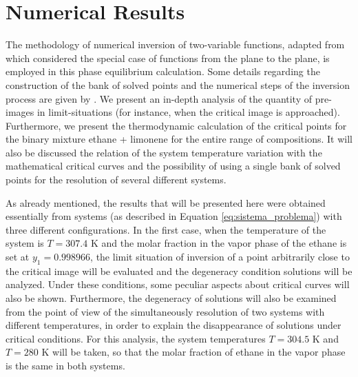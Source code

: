 \documentclass[journal=iecred,manuscript=article]{achemso}
\theoremstyle{definition}
\theoremstyle{remark}
\begin{document}
%

\section{Numerical Results}

The methodology of numerical inversion of two-variable functions, adapted from \citet{malta} which considered the special case of functions from the plane to the plane, is employed in this phase equilibrium calculation. Some details regarding the construction of the bank of solved points and the numerical steps of the inversion process are given by \citet{ireme}. We present an in-depth analysis of the quantity of pre-images in limit-situations (for instance, when  the critical image is approached). Furthermore, we present the thermodynamic calculation of the critical points for the binary mixture ethane + limonene for the entire range of compositions. It will also be discussed the relation of the system temperature variation with the mathematical critical curves and the possibility of using a single bank of solved points for the resolution of several different systems.

As already mentioned, the results that will be presented here were obtained essentially from systems (as described in Equation \ref{eq:sistema_problema}) with three different configurations. In the first case, when the temperature of the system is $ T = 307.4 $ K and the molar fraction in the vapor phase of the ethane is set at $ y_{1} = 0.998966 $, the limit situation of inversion of a point arbitrarily close to the critical image will be evaluated and the degeneracy condition solutions will be analyzed. Under these conditions, some peculiar aspects about critical curves will also be shown. Furthermore, the degeneracy of solutions will also be examined from the point of view of the simultaneously resolution of two systems with different temperatures, in order to explain the disappearance of solutions under critical conditions. For this analysis, the system temperatures $ T = 304.5 $ K and $ T = 280 $ K will be taken, so that the molar fraction of ethane in the vapor phase is the same in both systems.
 
\end{document}

